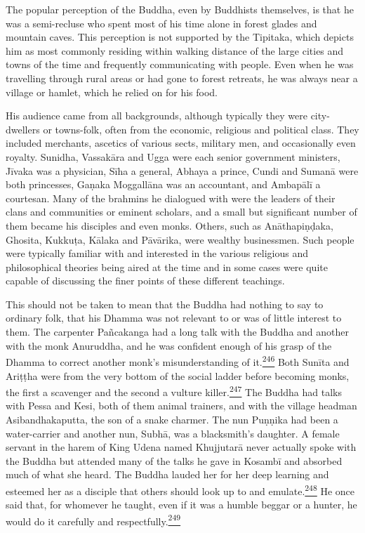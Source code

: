 The popular perception of the Buddha, even by Buddhists themselves, is
that he was a semi-recluse who spent most of his time alone in forest
glades and mountain caves. This perception is not supported by the
Tipitaka, which depicts him as most commonly residing within walking
distance of the large cities and towns of the time and frequently
communicating with people. Even when he was travelling through rural
areas or had gone to forest retreats, he was always near a village or
hamlet, which he relied on for his food.

His audience came from all backgrounds, although typically they were
city-dwellers or towns-folk, often from the economic, religious and
political class. They included merchants, ascetics of various sects,
military men, and occasionally even royalty. Sunidha, Vassakāra and Ugga
were each senior government ministers, Jīvaka was a physician, Sīha a
general, Abhaya a prince, Cundi and Sumanā were both princesses, Gaṇaka
Moggallāna was an accountant, and Ambapālī a courtesan. Many of the
brahmins he dialogued with were the leaders of their clans and
communities or eminent scholars, and a small but significant number of
them became his disciples and even monks. Others, such as Anāthapiṇḍaka,
Ghosita, Kukkuṭa, Kālaka and Pāvārika, were wealthy businessmen. Such
people were typically familiar with and interested in the various
religious and philosophical theories being aired at the time and in some
cases were quite capable of discussing the finer points of these
different teachings.

This should not be taken to mean that the Buddha had nothing to say to
ordinary folk, that his Dhamma was not relevant to or was of little
interest to them. The carpenter Pañcakanga had a long talk with the
Buddha and another with the monk Anuruddha, and he was confident enough
of his grasp of the Dhamma to correct another monk's misunderstanding of
it.\label{footprints_split_010.html_fnref246}\hyperref[footprints_split_024.htmlux5cux23fn246]{\textsuperscript{246}}
Both Sunīta and Ariṭṭha were from the very bottom of the social ladder
before becoming monks, the first a scavenger and the second a vulture
killer.\label{footprints_split_010.html_fnref247}\hyperref[footprints_split_024.htmlux5cux23fn247]{\textsuperscript{247}}
The Buddha had talks with Pessa and Kesi, both of them animal trainers,
and with the village headman Asibandhakaputta, the son of a snake
charmer. The nun Puṇṇika had been a water-carrier and another nun,
Subhā, was a blacksmith's daughter. A female servant in the harem of
King Udena named Khujjutarā never actually spoke with the Buddha but
attended many of the talks he gave in Kosambī and absorbed much of what
she heard. The Buddha lauded her for her deep learning and esteemed her
as a disciple that others should look up to and
emulate.\label{footprints_split_010.html_fnref248}\hyperref[footprints_split_024.htmlux5cux23fn248]{\textsuperscript{248}}
He once said that, for whomever he taught, even if it was a humble
beggar or a hunter, he would do it carefully and
respectfully.\label{footprints_split_010.html_fnref249}\hyperref[footprints_split_024.htmlux5cux23fn249]{\textsuperscript{249}}

